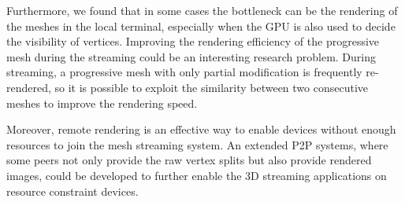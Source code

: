 Furthermore, we found that in some cases the bottleneck can be the rendering of the meshes in the local 
terminal, especially when the GPU is also used to decide the visibility of vertices. 
Improving the rendering efficiency of the progressive mesh during the streaming 
could be an interesting research problem.  
During streaming, a progressive mesh with only partial modification is frequently re-rendered, 
so it is possible to exploit the similarity between two consecutive meshes to improve the rendering speed.

Moreover, remote rendering is an effective way to enable devices without enough resources to 
join the mesh streaming system. An extended P2P systems, where some peers not only provide the raw vertex splits
but also provide rendered images, could be developed to further enable the 3D streaming applications on resource
constraint devices.

